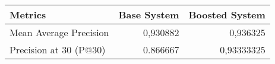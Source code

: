 \begin{tabular}{lrr}
    \toprule
                   Metrics &  Base System &  Boosted System \\
    \midrule
         Mean Average Precision &     0,930882 &        0,936325 \\
    Precision at 30 (P@30) &     0.866667 &        0,93333325 \\
    \bottomrule
    \end{tabular}
    